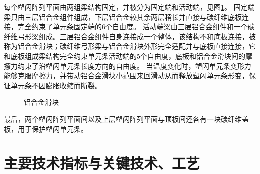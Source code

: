 每个塑闪阵列平面由两组梁结构固定，并被分为固定端和活动端，见图\ref{fig:description:girders}。
固定端梁只由三层铝合金组件组成，下层铝合金较其余两层稍长并直接与碳纤维底板连接，完全约束了单元条固定端的6个自由度。
活动端梁由三层铝合金组件和一个碳纤维弓形梁组成。三层铝合金组件自身连接成一个整体，该结构不和底板连接，被称为铝合金滑块；碳纤维弓形梁与铝合金滑块外形完全适配并与底板直接连接，它和底板组成梁结构完全约束单元条活动端的5个自由度，底板和铝合金滑块间的摩擦力约束了沿塑闪单元条长度方向的自由度。
当温度变化时，塑闪单元条变形力能够克服摩擦力，并带动铝合金滑块小范围来回滑动从而释放塑闪单元条形变，保证单元条不因膨胀收缩而断裂。

\begin{figure}[h!]
	\centering
	\caption{铝合金滑块}
	\label{fig:description:girders}
\end{figure}

最后，两个塑闪阵列平面间以及上层塑闪阵列平面与顶板间还各有一块碳纤维盖板，用于保护塑闪单元条。

\section{主要技术指标与关键技术、工艺}
\label{sec:description:psd_requirements}
